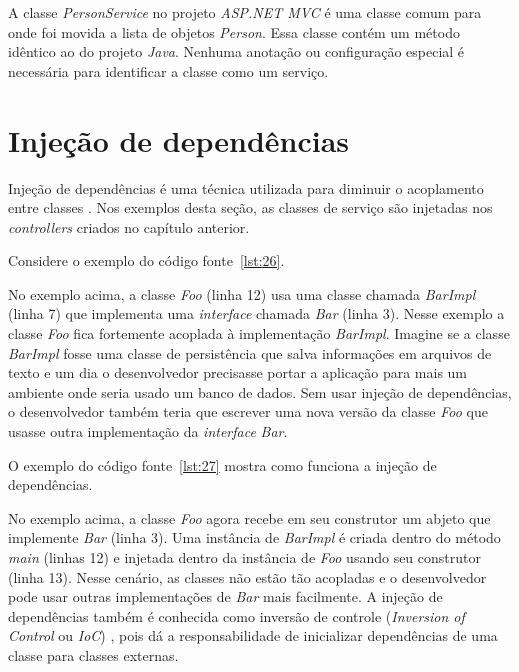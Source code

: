 A classe \textit{PersonService} no projeto \textit{ASP.NET MVC} é uma classe comum para onde foi movida a lista de objetos \textit{Person}. Essa classe contém um método idêntico ao do projeto \textit{Java}. Nenhuma anotação ou configuração especial é necessária para identificar a classe como um serviço.

\section{Injeção de dependências}

Injeção de dependências é uma técnica utilizada para diminuir o acoplamento entre classes \cite{8}. Nos exemplos desta seção, as classes de serviço são injetadas nos \textit{controllers} criados no capítulo anterior. 

Considere o exemplo do código fonte~\ref{lst:26}.


No exemplo acima, a classe \textit{Foo} (linha 12) usa uma classe chamada \textit{BarImpl} (linha 7) que implementa uma \textit{interface} chamada \textit{Bar} (linha 3). Nesse exemplo a classe \textit{Foo} fica fortemente acoplada à implementação \textit{BarImpl}. Imagine se a classe \textit{BarImpl} fosse uma classe de persistência que salva informações em arquivos de texto e um dia o desenvolvedor precisasse portar a aplicação para mais um ambiente onde seria usado um banco de dados. Sem usar injeção de dependências, o desenvolvedor também teria que escrever uma nova versão da classe \textit{Foo} que usasse outra implementação da \textit{interface} \textit{Bar}.

O exemplo do código fonte~\ref{lst:27} mostra como funciona a injeção de dependências.


No exemplo acima, a classe \textit{Foo} agora recebe em seu construtor um abjeto que implemente \textit{Bar} (linha 3). Uma instância de \textit{BarImpl} é criada dentro do método \textit{main} (linhas 12) e injetada dentro da instância de \textit{Foo} usando seu construtor (linha 13). Nesse cenário, as classes não estão tão acopladas e o desenvolvedor pode usar outras implementações de \textit{Bar} mais facilmente. A injeção de dependências também é conhecida como inversão de controle (\textit{Inversion of Control} ou \textit{IoC}) \cite{6}, pois dá a responsabilidade de inicializar dependências de uma classe para classes externas. 

